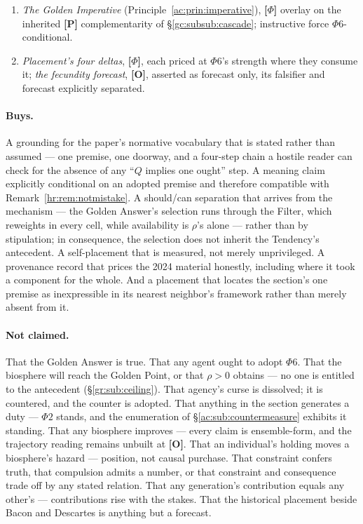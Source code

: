 \documentclass[11pt]{article}
\numberwithin{equation}{section}
\theoremstyle{plain}
\theoremstyle{definition}
\theoremstyle{remark}
\begin{document}
\begin{enumerate}
    \item \emph{The Golden Imperative} (Principle~\ref{ac:prin:imperative}), \textbf{[$\Phi$]} overlay on the inherited \textbf{[P]} complementarity of \S\ref{gc:subsub:cascade}; instructive force $\Phi6$-conditional.
    \item \emph{Placement's four deltas}, \textbf{[$\Phi$]}, each priced at $\Phi6$'s strength where they consume it; \emph{the fecundity forecast}, \textbf{[O]}, asserted as forecast only, its falsifier and forecast explicitly separated.
\end{enumerate}

\paragraph{Buys.} A grounding for the paper's normative vocabulary that is stated rather than assumed --- one premise, one doorway, and a four-step chain a hostile reader can check for the absence of any ``$Q$ implies one ought'' step. A meaning claim explicitly conditional on an adopted premise and therefore compatible with Remark~\ref{hr:rem:notmistake}. A should/can separation that arrives from the mechanism --- the Golden Answer's selection runs through the Filter, which reweights in every cell, while availability is $\rho$'s alone --- rather than by stipulation; in consequence, the selection does not inherit the Tendency's antecedent. A self-placement that is measured, not merely unprivileged. A provenance record that prices the 2024 material honestly, including where it took a component for the whole. And a placement that locates the section's one premise as inexpressible in its nearest neighbor's framework rather than merely absent from it.

\paragraph{Not claimed.} That the Golden Answer is true. That any agent ought to adopt $\Phi6$. That the biosphere will reach the Golden Point, or that $\rho > 0$ obtains --- no one is entitled to the antecedent (\S\ref{gr:sub:ceiling}). That agency's curse is dissolved; it is countered, and the counter is adopted. That anything in the section generates a duty --- $\Phi2$ stands, and the enumeration of \S\ref{ac:sub:countermeasure} exhibits it standing. That any biosphere improves --- every claim is ensemble-form, and the trajectory reading remains unbuilt at \textbf{[O]}. That an individual's holding moves a biosphere's hazard --- position, not causal purchase. That constraint confers truth, that compulsion admits a number, or that constraint and consequence trade off by any stated relation. That any generation's contribution equals any other's --- contributions rise with the stakes. That the historical placement beside Bacon and Descartes is anything but a forecast.
\end{document}
